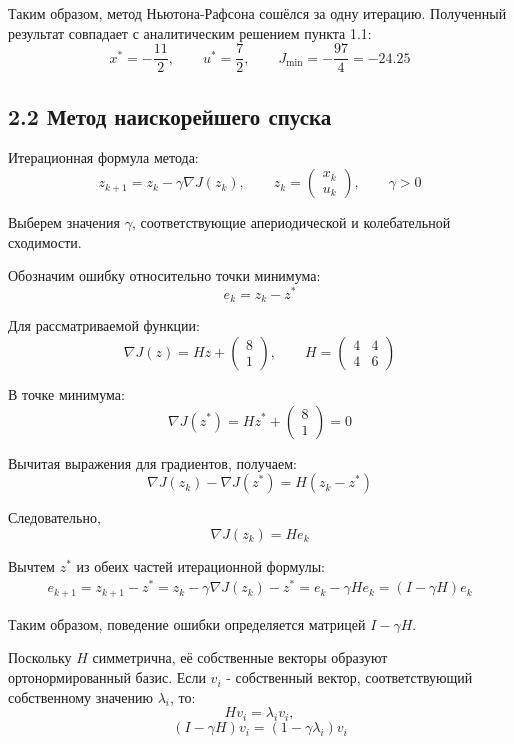 Таким образом, метод Ньютона-Рафсона сошёлся
за одну итерацию. Полученный результат совпадает
с аналитическим решением пункта 1.1:
\[
\boxed{
x^*=-\frac{11}{2},\qquad
u^*=\frac72,\qquad
J_{\min}=-\frac{97}{4}=-24.25
}
\]


\subsection*{2.2 Метод наискорейшего спуска}

Итерационная формула метода:
\[
z_{k+1}=z_k-\gamma\nabla J(z_k),
\qquad
z_k=
\begin{pmatrix}
x_k\\
u_k
\end{pmatrix},
\qquad \gamma>0
\]

Выберем значения \(\gamma\), соответствующие
апериодической и колебательной сходимости.

Обозначим ошибку относительно точки минимума:
\[
e_k=z_k-z^*
\]

Для рассматриваемой функции:
\[
\nabla J(z)=Hz+
\begin{pmatrix}
8\\
1
\end{pmatrix},
\qquad
H=
\begin{pmatrix}
4&4\\
4&6
\end{pmatrix}
\]

В точке минимума:
\[
\nabla J(z^*)=Hz^*+
\begin{pmatrix}
8\\
1
\end{pmatrix}=0
\]

Вычитая выражения для градиентов, получаем:
\[
\nabla J(z_k)-\nabla J(z^*)
=H(z_k-z^*)
\]

Следовательно,
\[
\nabla J(z_k)=He_k
\]

Вычтем \(z^*\) из обеих частей итерационной формулы:
\[
\begin{aligned}
e_{k+1}=z_{k+1}-z^*=z_k-\gamma\nabla J(z_k)-z^*=e_k-\gamma He_k=(I-\gamma H)e_k
\end{aligned}
\]

Таким образом, поведение ошибки определяется
матрицей \(I-\gamma H\).

Поскольку \(H\) симметрична, её собственные векторы
образуют ортонормированный базис.
Если \(v_i\) - собственный вектор, соответствующий
собственному значению \(\lambda_i\), то:
\[
Hv_i=\lambda_i v_i,
\]
\[
(I-\gamma H)v_i=(1-\gamma\lambda_i)v_i
\]

